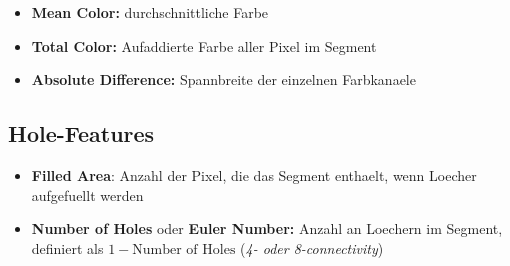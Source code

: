 \begin{itemize}
  \item \textbf{Mean Color:} durchschnittliche Farbe
  \item \textbf{Total Color:} Aufaddierte Farbe aller Pixel im Segment
  \item \textbf{Absolute Difference:} Spannbreite der einzelnen Farbkanaele
\end{itemize}

\subsection{Hole-Features}

\begin{itemize}
  \item \textbf{Filled Area}: Anzahl der Pixel, die das Segment enthaelt, wenn Loecher aufgefuellt werden
  \item \textbf{Number of Holes} oder \textbf{Euler Number:} Anzahl an Loechern im Segment, definiert als $1 - \text{Number of Holes}$ (\emph{4- oder 8-connectivity})
\end{itemize}
